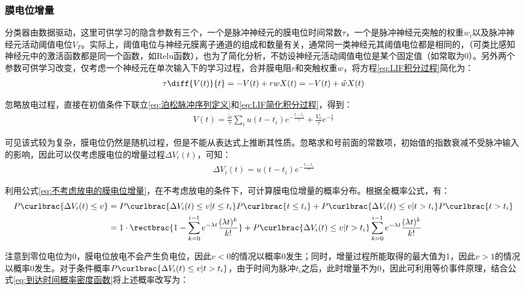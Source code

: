\documentclass[11pt]{article}
\begin{document}
\subsubsection{膜电位增量}
分类器由数据驱动，这里可供学习的隐含参数有三个，一个是脉冲神经元的膜电位时间常数$\tau$，一个是脉冲神经元突触的权重$w_i$以及脉冲神经元活动阈值电位$V_T$。实际上，阈值电位与神经元膜离子通道的组成和数量有关，通常同一类神经元其阈值电位都是相同的，（可类比感知神经元中的激活函数都是同一个函数，如Relu函数），也为了简化分析，不妨设神经元活动阈值电位是某个固定值（如常取为0）。另外两个参数可供学习改变，仅考虑一个神经元在单次输入下的学习过程，合并膜电阻$r$和突触权重$w$，将方程\ref{eq:LIF积分过程}简化为：
\begin{align}
  \tau\diff{V(t)}{t}=-V(t)+rwX(t)=-V(t)+\tilde{w}X(t)
  \label{eq:LIF简化积分过程}
\end{align}\par
忽略放电过程，直接在初值条件下联立\ref{eq:泊松脉冲序列定义}和\ref{eq:LIF简化积分过程}，得到：
\begin{align}
  V(t)=\frac{\tilde{w}}{\tau}\sum\limits_{i}u(t-t_i)e^{-\frac{t-t_i}{\tau}}+\frac{V_0}{\tau}e^{-\frac{t}{\tau}}
\end{align}\par
可见该式较为复杂，膜电位仍然是随机过程，但是不能从表达式上推断其性质。忽略求和号前面的常数项，初始值的指数衰减不受脉冲输入的影响，因此可以仅考虑膜电位的增量过程$\Delta V_i(t)$，可知：
\begin{align}
  \Delta V_i(t)=u(t-t_i)e^{-\frac{t-t_i}{\tau}}
  \label{eq:不考虑放电的膜电位增量}
\end{align}\par
利用公式\ref{eq:不考虑放电的膜电位增量}，在不考虑放电的条件下，可计算膜电位增量的概率分布。根据全概率公式，有：
\begin{align}
  \begin{aligned}
    P\curlbrac{\Delta V_i(t)\le v} & =P\curlbrac{\Delta V_i(t)\le v|t\le t_i}P\curlbrac{t\le t_i}+P\curlbrac{\Delta V_i(t)\le v|t> t_i}P\curlbrac{t>t_i}                                                    \\
                                   & =1\cdot\rectbrac{1-\sum_{k=0}^{i-1}e^{-\lambda t}\frac{(\lambda t)^k}{k!}}+P\curlbrac{\Delta V_i(t)\le v|t> t_i}\sum_{k=0}^{i-1}e^{-\lambda t}\frac{(\lambda t)^k}{k!}
  \end{aligned}\label{eq:膜电位增量概率分布}
\end{align}\par
注意到零位电位为0，膜电位放电不会产生负电位，因此$v<0$的情况以概率0发生；同时，增量过程所能取得的最大值为1，因此$v>1$的情况以概率0发生。对于条件概率$P\curlbrac{\Delta V_i(t)\le v|t> t_i}$，由于时间为脉冲$t_i$之后，此时增量不为0，因此可利用等价事件原理，结合公式\ref{eq:到达时间概率密度函数}将上述概率改写为：
\end{document}
